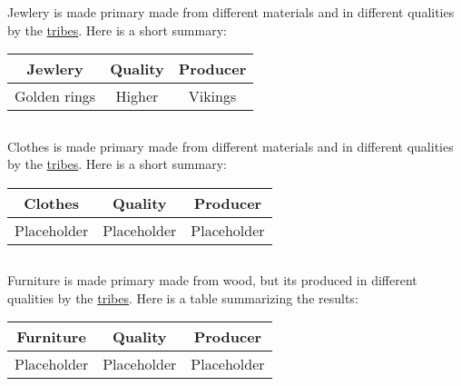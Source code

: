 \Gls{Jewlery} is made primary made from different materials and in different qualities by the
\hyperref[ch:Tribes]{tribes}. Here is a short summary:

\begin{longtable}{ccc}
	\toprule
	\Gls*{Jewlery} & Quality & Producer      \\
	\midrule
	Golden rings   & Higher  & \Gls{Vikings} \\ \bottomrule
\end{longtable}

\subsection{}\label{ch:Goods:Merchandise:Clothes}

\Gls{Clothes} is made primary made from different materials and in different qualities by the
\hyperref[ch:Tribes]{tribes}. Here is a short summary:

\begin{longtable}{ccc}
	\toprule
	\Gls*{Clothes} & Quality     & Producer    \\
	\midrule
	Placeholder    & Placeholder & Placeholder \\
	\bottomrule
\end{longtable}

\subsection{}\label{ch:Goods:Merchandise:Furniture}

\Gls{Furniture} is made primary made from wood, but its produced in different qualities by the
\hyperref[ch:Tribes]{tribes}. Here is a table summarizing the results:

\begin{longtable}{ccc}
	\toprule
	\Gls{Furniture} & Quality     & Producer    \\
	\midrule
	Placeholder     & Placeholder & Placeholder \\
	\bottomrule
\end{longtable}
